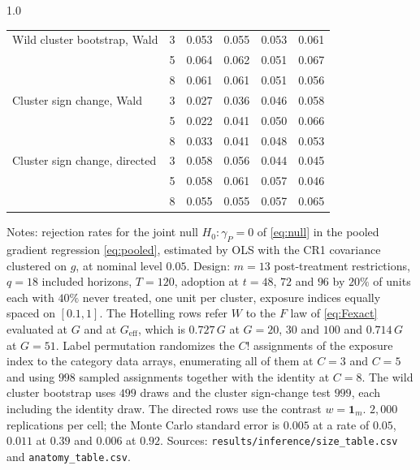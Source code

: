 \documentclass[12pt]{article}
\theoremstyle{definition}
\numberwithin{equation}{section}
\begin{document}
\begin{table}[!tbp]
\begin{spacing}{1.0}
\begin{tabular}{llrrrr}
Wild cluster bootstrap, Wald      & 3 & 0.053 & 0.055 & 0.053 & 0.061 \\
                                  & 5 & 0.064 & 0.062 & 0.051 & 0.067 \\
                                  & 8 & 0.061 & 0.061 & 0.051 & 0.056 \\
\addlinespace
Cluster sign change, Wald         & 3 & 0.027 & 0.036 & 0.046 & 0.058 \\
                                  & 5 & 0.022 & 0.041 & 0.050 & 0.066 \\
                                  & 8 & 0.033 & 0.041 & 0.048 & 0.053 \\
\addlinespace
Cluster sign change, directed     & 3 & 0.058 & 0.056 & 0.044 & 0.045 \\
                                  & 5 & 0.058 & 0.061 & 0.057 & 0.046 \\
                                  & 8 & 0.055 & 0.055 & 0.057 & 0.065 \\
\bottomrule
\end{tabular}

\smallskip
\begin{minipage}{0.95\textwidth}
\footnotesize Notes: rejection rates for the joint null $H_0: \gamma_P = 0$ of
\eqref{eq:null} in the pooled gradient regression \eqref{eq:pooled}, estimated
by OLS with the CR1 covariance clustered on $g$, at nominal level $0.05$.
Design: $m = 13$ post-treatment restrictions, $q = 18$ included horizons,
$T = 120$, adoption at $t = 48$, $72$ and $96$ by $20\%$ of units each with
$40\%$ never treated, one unit per cluster, exposure indices equally spaced on
$[0.1,1]$. The Hotelling rows refer $W$ to the $F$ law of \eqref{eq:Fexact}
evaluated at $G$ and at $G_{\mathrm{eff}}$, which is $0.727\,G$ at
$G = 20$, $30$ and $100$ and $0.714\,G$ at $G = 51$. Label permutation
randomizes the $C!$ assignments of the exposure index to the category data
arrays, enumerating all of them at $C = 3$ and $C = 5$ and using $998$ sampled
assignments together with the identity at $C = 8$. The wild cluster bootstrap
uses $499$ draws and the cluster sign-change test $999$, each including the
identity draw. The directed rows use the contrast $w = \mathbf{1}_m$.
$2{,}000$ replications per cell; the Monte Carlo standard error is $0.005$ at
a rate of $0.05$, $0.011$ at $0.39$ and $0.006$ at $0.92$. Sources:
\texttt{results/inference/size\_table.csv} and
\texttt{anatomy\_table.csv}.
\end{minipage}
\end{spacing}
\end{table}
\end{document}
